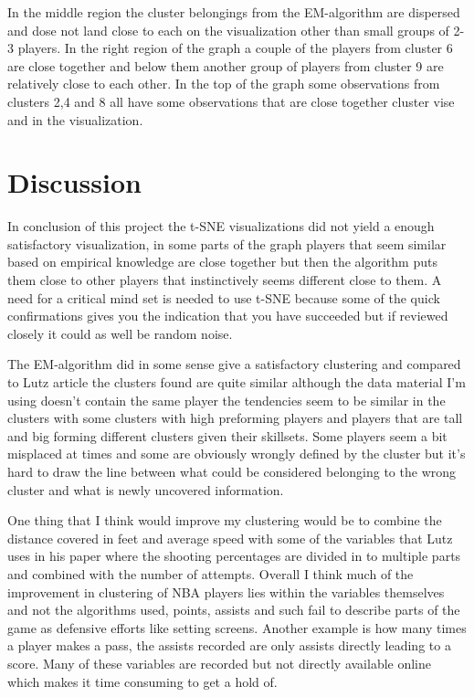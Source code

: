 \documentclass{article}
\begin{document}
In the middle region the cluster belongings from the EM-algorithm are dispersed and dose not land close to each on the visualization other than small groups of 2-3 players. In the right region of the graph a couple of the players from cluster 6 are close together and below them another group of players from cluster 9 are relatively close to each other. In the top of the graph some observations from clusters 2,4 and 8 all have some observations that are close together cluster vise and in the visualization.


\newpage

\section{Discussion}

In conclusion of this project the t-SNE visualizations did not yield a enough satisfactory visualization, in some parts of the graph players that seem similar based on empirical knowledge are close together but then the algorithm puts them close to other players that instinctively seems different close to them. A need for a critical mind set is needed to use t-SNE because some of the quick confirmations gives you the indication that you have succeeded but if reviewed closely it could as well be random noise.

The EM-algorithm did in some sense give a satisfactory clustering and compared to Lutz article the clusters found are quite similar although the data material I’m using doesn’t contain the same player the tendencies seem to be similar in the clusters with some clusters with high preforming players and players that are tall and big forming different clusters given their skillsets. Some players seem a bit misplaced at times and some are obviously wrongly defined by the cluster but it’s hard to draw the line between what could be considered belonging to the wrong cluster and what is newly uncovered information.

One thing that I think would improve my clustering would be to combine the distance covered in feet and average speed with some of the variables that Lutz uses in his paper where the shooting percentages are divided in to multiple parts and combined with the number of attempts. Overall I think much of the improvement in clustering of NBA players lies within the variables themselves and not the algorithms used, points, assists and such fail to describe parts of the game as defensive efforts like setting screens. Another example is how many times a player makes a pass, the assists recorded are only assists directly leading to a score. Many of these variables are recorded but not directly available online which makes it time consuming to get a hold of.
\end{document}
